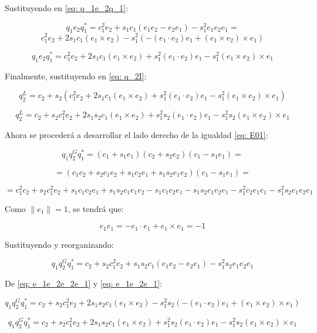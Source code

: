 \documentclass[12pt, a4paper]{report}
\begin{document}
Sustituyendo en \eqref{eq: q_1e_2q_1}:

$$ q_1e_2q_1^* = c_1^2e_2 + s_1c_1(e_1e_2 - e_2e_1) - s_1^2e_1e_2e_1 = $$
$$ c_1^2e_2 + 2s_1c_1(e_1 \times e_2) - s_1^2(-(e_1 \cdot e_2)e_1 + (e_1 \times e_2) \times e_1) $$

\begin{equation}
q_1e_2q_1^* = c_1^2e_2 + 2s_1c_1(e_1 \times e_2) + s_1^2(e_1 \cdot e_2)e_1 - s_1^2(e_1 \times e_2) \times e_1
\end{equation}

Finalmente, sustituyendo en \eqref{eq: q_2I}:

$$ q_2^L = c_2 + s_2(c_1^2e_2 + 2s_1c_1(e_1 \times e_2) + s_1^2(e_1 \cdot e_2)e_1 - s_1^2(e_1 \times e_2) \times e_1) $$

\begin{equation} \label{eq: E02}
q_2^L = c_2 + s_2c_1^2e_2 + 2s_1s_2c_1(e_1 \times e_2) + s_1^2s_2(e_1 \cdot e_2)e_1 - s_1^2s_2(e_1 \times e_2) \times e_1
\end{equation}

Ahora se procederá a desarrollar el lado derecho de la igualdad \eqref{eq: E01}:

$$ q_1q_2^Gq_1^* = (c_1 + s_1 e_1)(c_2 + s_2 e_2)(c_1 - s_1 e_1) = $$

$$ = (c_1c_2 + s_2c_1e_2 + s_1c_2e_1 + s_1s_2e_1e_2)(c_1 - s_1 e_1) = $$

$$ = c_1^2c_2 + s_2c_1^2e_2 + s_1c_1c_2e_1 + s_1s_2c_1e_1e_2 - s_1c_1c_2e_1 - s_1s_2c_1e_2e_1 - s_1^2c_2e_1e_1 - s_1^2s_2e_1e_2e_1 $$

Como $\|e_1\| = 1$, se tendrá que:

\begin{equation}
e_1e_1 = -e_1 \cdot e_1 + e_1 \times e_1 = -1
\end{equation}

Sustituyendo y reorganizando:

$$ q_1q_2^Gq_1^* = c_2 + s_2c_1^2e_2 + s_1s_2c_1(e_1e_2 - e_2e_1) - s_1^2s_2e_1e_2e_1 $$

De \eqref{eq: e_1e_2e_2e_1} y \eqref{eq: e_1e_2e_1}:

$$ q_1q_2^Gq_1^* = c_2 + s_2c_1^2e_2 + 2s_1s_2c_1(e_1 \times e_2) - s_1^2s_2(-(e_1 \cdot e_2)e_1 + (e_1 \times e_2) \times e_1) $$

\begin{equation} \label{eq: E03}
q_1q_2^Gq_1^* = c_2 + s_2c_1^2e_2 + 2s_1s_2c_1(e_1 \times e_2) + s_1^2s_2(e_1 \cdot e_2)e_1 - s_1^2s_2(e_1 \times e_2) \times e_1
\end{equation}
\end{document}
